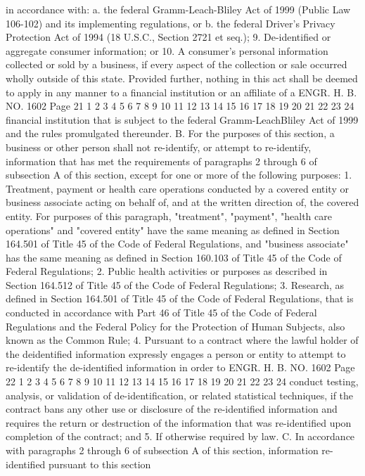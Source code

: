 in accordance with:
a. the federal Gramm-Leach-Bliley Act of 1999 (Public Law
106-102) and its implementing regulations, or
b. the federal Driver's Privacy Protection Act of 1994
(18 U.S.C., Section 2721 et seq.);
9. De-identified or aggregate consumer information; or
10. A consumer's personal information collected or sold by a
business, if every aspect of the collection or sale occurred wholly
outside of this state.
Provided further, nothing in this act shall be deemed to apply
in any manner to a financial institution or an affiliate of a 
ENGR. H. B. NO. 1602 Page 21
1
2
3
4
5
6
7
8
9
10
11
12
13
14
15
16
17
18
19
20
21
22
23
24
financial institution that is subject to the federal Gramm-LeachBliley Act of 1999 and the rules promulgated thereunder.
B. For the purposes of this section, a business or other person
shall not re-identify, or attempt to re-identify, information that
has met the requirements of paragraphs 2 through 6 of subsection A
of this section, except for one or more of the following purposes:
1. Treatment, payment or health care operations conducted by a
covered entity or business associate acting on behalf of, and at the
written direction of, the covered entity. For purposes of this
paragraph, "treatment", "payment", "health care operations" and
"covered entity" have the same meaning as defined in Section 164.501
of Title 45 of the Code of Federal Regulations, and "business
associate" has the same meaning as defined in Section 160.103 of
Title 45 of the Code of Federal Regulations;
2. Public health activities or purposes as described in Section
164.512 of Title 45 of the Code of Federal Regulations;
3. Research, as defined in Section 164.501 of Title 45 of the
Code of Federal Regulations, that is conducted in accordance with
Part 46 of Title 45 of the Code of Federal Regulations and the
Federal Policy for the Protection of Human Subjects, also known as
the Common Rule;
4. Pursuant to a contract where the lawful holder of the deidentified information expressly engages a person or entity to
attempt to re-identify the de-identified information in order to 
ENGR. H. B. NO. 1602 Page 22
1
2
3
4
5
6
7
8
9
10
11
12
13
14
15
16
17
18
19
20
21
22
23
24
conduct testing, analysis, or validation of de-identification, or
related statistical techniques, if the contract bans any other use
or disclosure of the re-identified information and requires the
return or destruction of the information that was re-identified upon
completion of the contract; and
5. If otherwise required by law.
C. In accordance with paragraphs 2 through 6 of subsection A of
this section, information re-identified pursuant to this section
